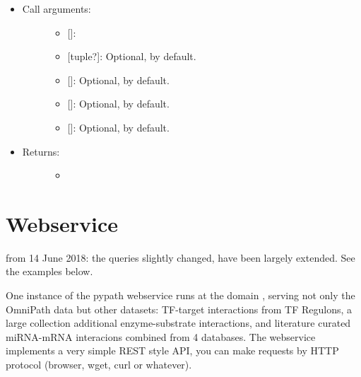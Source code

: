\documentclass[letterpaper,10pt,english]{sphinxmanual}
\begin{document}
\begin{fulllineitems}
\begin{itemize}
\begin{description}
\end{description}

\item {} \begin{description}
\item[{Call arguments:}] \leavevmode\begin{itemize}
\item {} 
 {[}{]}:

\item {} 
 {[}tuple?{]}: Optional,  by default.

\item {} 
 {[}{]}: Optional,  by default.

\item {} 
 {[}{]}: Optional,  by default.

\item {} 
 {[}{]}: Optional,  by default.

\end{itemize}

\end{description}

\item {} \begin{description}
\item[{Returns:}] \leavevmode\begin{itemize}
\item {} 
\end{itemize}

\end{description}

\end{itemize}

\end{fulllineitems}



\chapter{Webservice}
\label{\detokenize{webservice:webservice}}\label{\detokenize{webservice::doc}}
 from 14 June 2018: the queries slightly changed, have been
largely extended. See the examples below.

One instance of the pypath webservice runs at the domain
, serving not only the OmniPath data but other datasets:
TF-target interactions from TF Regulons, a large collection additional
enzyme-substrate interactions, and literature curated miRNA-mRNA interacions
combined from 4 databases. The webservice implements a very simple REST style
API, you can make requests by HTTP protocol (browser, wget, curl or whatever).
\end{document}
